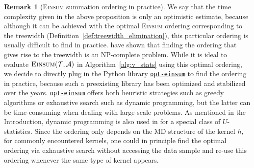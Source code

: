 \documentclass[12pt]{article}
\newcommand{\libref}[2]{\href{#2}{\texttt{#1}}}
\def\package{\libref{u-stats}{https://github.com/zrq1706/U-Statistics-Python}}
\theoremstyle{plain}
\theoremstyle{definition}
\newtheorem{remark}{Remark}
\def\Einsum{\textsc{Einsum}}
\newcommand{\tensorcontraction}{\textsc{Einsum}}
\def\package{\libref{u-stats}{https://github.com/zrq1706/U-Statistics-Python}}
\newcommand{\opteinsum}{\libref{opt-einsum}{https://dgasmith.github.io/opt_einsum/}}
\def\calA{\mathcal{A}}
\def\calT{\mathcal{T}}
\begin{document}
\begin{bibunit}[agsm]
\begin{remark}[\Einsum{} summation ordering in practice]
\label{rem:ordering}
We say that the time complexity given in the above proposition is only an optimistic estimate, because although it can be achieved with the optimal \Einsum{} ordering corresponding to the treewidth (Definition~\ref{def:treewidth_elimination}), this particular ordering is usually difficult to find in practice. \citet{arnborg1987complexity} have shown that finding the ordering that gives rise to the treewidth is an NP-complete problem. While it is ideal to evaluate $\tensorcontraction(\calT, \calA)$ in Algorithm~\ref{alg:v_stats} using this optimal ordering, we decide to directly plug in the Python library \opteinsum{} \citep{daniel2018opt} to find the ordering in practice, because such a preexisting library has been optimized and stabilized over the years. \opteinsum{} offers both heuristic strategies such as greedy algorithms or exhaustive search such as dynamic programming, but the latter can be time-consuming when dealing with large-scale problems. As mentioned in the Introduction, dynamic programming is also used in \citet{zhang2025adaptive} for a special class of $U$-statistics. Since the ordering only depends on the MD structure of the kernel $h$, for commonly encountered kernels, one could in principle find the optimal ordering via exhaustive search without accessing the data sample and re-use this ordering whenever the same type of kernel appears. %


\end{remark}


\end{bibunit}
\end{document}
